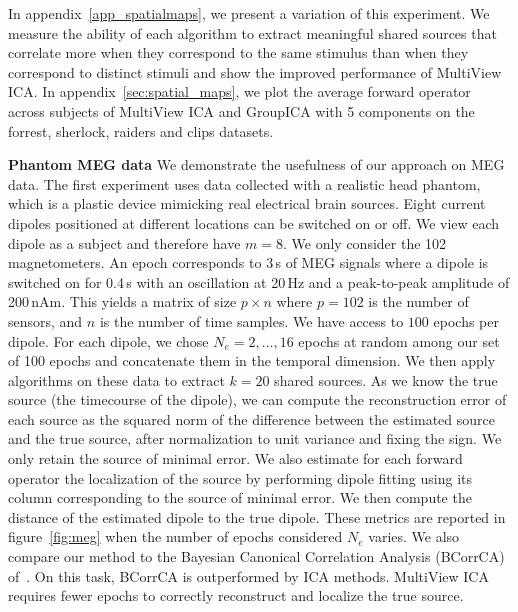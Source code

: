 In appendix~\ref{app_spatialmaps}, we present a variation of this experiment.  We measure the ability of each algorithm to extract meaningful shared sources that correlate more when they correspond to the same stimulus than when they correspond to distinct stimuli and show the improved performance of MultiView ICA. 
%
In appendix~\ref{sec:spatial_maps}, we plot the average forward operator across subjects of MultiView ICA and GroupICA with 5 components on the forrest, sherlock, raiders and clips datasets.

\textbf{Phantom MEG data}
We demonstrate the usefulness of our approach on MEG data.
%
The first experiment uses data collected with a realistic head phantom, which is a plastic device mimicking real electrical brain sources.
%
Eight current dipoles positioned at different locations can be switched on or off.
%
We view each dipole as a subject and therefore have $m=8$.
%
We only consider the 102 magnetometers.
%
An epoch corresponds to 3\,s of MEG signals where a dipole is switched on for 0.4\,s with an oscillation at 20\,Hz and a peak-to-peak amplitude of 200\,nAm.
%
This yields a matrix of size $p\times n$ where $p=102$ is the number of sensors, and $n$ is the number of time samples.
%
We have access to $100$ epochs per dipole.
%
For each dipole, we chose $N_e=2, \dots, 16$ epochs at random among our set of 100 epochs and concatenate them in the temporal dimension.
%
We then apply algorithms on these data to extract $k=20$ shared sources.
%
As we know the true source (the timecourse of the dipole), we can compute the reconstruction error of each source as the squared norm of the difference between the estimated source and the true source, after normalization to unit variance and fixing the sign.
%
We only retain the source of minimal error.
%
We also estimate for each forward operator the localization of the source by performing dipole fitting using its column corresponding to the source of minimal error.
%
We then compute the distance of the estimated dipole to the true dipole.
%
These metrics are reported in figure~\ref{fig:meg} when the number of epochs considered $N_e$ varies.
%
We also compare our method to the Bayesian Canonical Correlation Analysis (BCorrCA) of~\cite{kamronn2015multiview}.
%
On this task, BCorrCA is outperformed by ICA methods.
%
MultiView ICA requires fewer epochs to correctly reconstruct and localize the true source.
%


